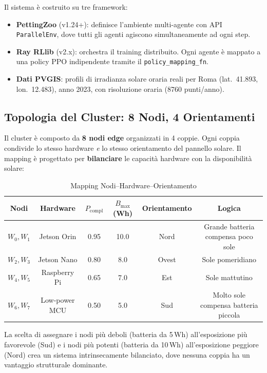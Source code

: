 \documentclass[11pt,a4paper]{article}
\begin{document}
Il sistema \`e costruito su tre framework:
\begin{itemize}[nosep]
    \item \textbf{PettingZoo} (v1.24+): definisce l'ambiente multi-agente con API \texttt{ParallelEnv}, dove tutti gli agenti agiscono simultaneamente ad ogni step.
    \item \textbf{Ray RLlib} (v2.x): orchestra il training distribuito. Ogni agente \`e mappato a una policy PPO indipendente tramite il \texttt{policy\_mapping\_fn}.
    \item \textbf{Dati PVGIS}: profili di irradianza solare oraria reali per Roma (lat.\ 41.893, lon.\ 12.483), anno 2023, con risoluzione oraria (8760 punti/anno).
\end{itemize}

\subsection{Topologia del Cluster: 8 Nodi, 4 Orientamenti}

Il cluster \`e composto da \textbf{8 nodi edge} organizzati in 4 coppie. Ogni coppia condivide lo stesso hardware \emph{e} lo stesso orientamento del pannello solare. Il mapping \`e progettato per \textbf{bilanciare} le capacit\`a hardware con la disponibilit\`a solare:

\begin{table}[h]
\centering
\caption{Mapping Nodi--Hardware--Orientamento}
\label{tab:mapping}
\begin{tabular}{@{}cccccc@{}}
\toprule
\textbf{Nodi} & \textbf{Hardware} & $P_{\text{compl}}$ & $B_{\max}$ (Wh) & \textbf{Orientamento} & \textbf{Logica} \\
\midrule
$W_0, W_1$ & Jetson Orin   & 0.95 & 10.0 & Nord  & Grande batteria compensa poco sole \\
$W_2, W_3$ & Jetson Nano   & 0.80 & 8.0  & Ovest & Sole pomeridiano \\
$W_4, W_5$ & Raspberry Pi  & 0.65 & 7.0  & Est   & Sole mattutino \\
$W_6, W_7$ & Low-power MCU & 0.50 & 5.0  & Sud   & Molto sole compensa batteria piccola \\
\bottomrule
\end{tabular}
\end{table}

La scelta di assegnare i nodi pi\`u deboli (batteria da 5\,Wh) all'esposizione pi\`u favorevole (Sud) e i nodi pi\`u potenti (batteria da 10\,Wh) all'esposizione peggiore (Nord) crea un sistema intrinsecamente bilanciato, dove nessuna coppia ha un vantaggio strutturale dominante.
\end{document}
